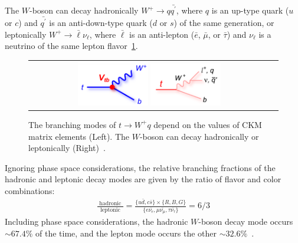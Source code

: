 The $W$-boson can decay hadronically $W^+ \rightarrow q \bar{q^\prime}$, where $q$ is an up-type quark ($u$ or $c$) and $\bar{q^\prime}$ is an anti-down-type quark ($d$ or $s$) of the same generation, or leptonically $W^+ \rightarrow \bar{\ell} \nu_\ell$, where $\bar{\ell}$ is an anti-lepton ($\bar{e}$, $\bar{\mu}$, or $\bar{\tau}$) and $\nu_\ell$ is a neutrino of the same lepton flavor~\ref{t_decay}.
\begin{figure}[!h]
  \begin{center}
    \begin{tabular}{cc}
        \includegraphics[width=0.30\textwidth]{fig_TopQuark/feynman_t_decay_Vtb_blue.png}
        \includegraphics[width=0.30\textwidth]{fig_TopQuark/feynman_t_decay_ljetsqq_pink.png}
    \end{tabular}
    \caption{The branching modes of $t \rightarrow W^+ q$ depend on the values of CKM matrix elements (Left).
             The $W$-boson can decay hadronically or leptonically (Right)~\cite{d0_diagrams}.
    }
    \label{t_decay}
  \end{center}
\end{figure}
Ignoring phase space considerations, the relative branching fractions of the hadronic and leptonic decay modes are given by the ratio of flavor and color combinations:
\begin{align}
\frac{\text { hadronic }}{\text { leptonic }}=\frac{\{u \bar{d}, c \bar{s} \} \times \{R, B, G\}}{\{e \bar{\nu_e}, \mu \bar{\nu_\mu}, \tau \bar{\nu_\tau} \}}=6 / 3
\end{align}
Including phase space considerations, the hadronic $W$-boson decay mode occurs $\sim 67.4 \%$ of the time, and the lepton mode occurs the other $\sim 32.6 \%$~\cite{bib:PDG}.

